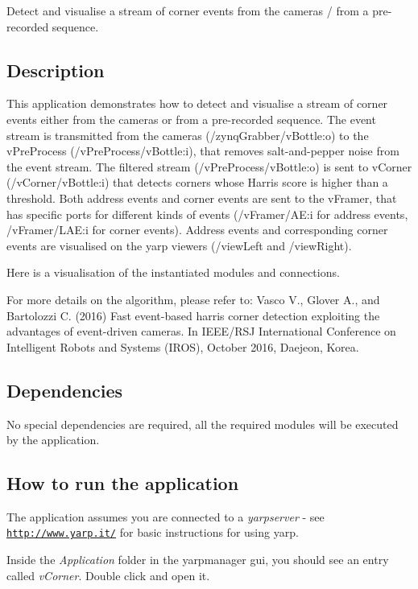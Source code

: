 Detect and visualise a stream of corner events from the cameras / from a pre-\/recorded sequence.

\subsection*{Description}

This application demonstrates how to detect and visualise a stream of corner events either from the cameras or from a pre-\/recorded sequence. The event stream is transmitted from the cameras (/zynq\+Grabber/v\+Bottle\+:o) to the v\+Pre\+Process (/v\+Pre\+Process/v\+Bottle\+:i), that removes salt-\/and-\/pepper noise from the event stream. The filtered stream (/v\+Pre\+Process/v\+Bottle\+:o) is sent to v\+Corner (/v\+Corner/v\+Bottle\+:i) that detects corners whose Harris score is higher than a threshold. Both address events and corner events are sent to the v\+Framer, that has specific ports for different kinds of events (/v\+Framer/\+AE\+:i for address events, /v\+Framer/\+L\+AE\+:i for corner events). Address events and corresponding corner events are visualised on the yarp viewers (/view\+Left and /view\+Right).

Here is a visualisation of the instantiated modules and connections.



For more details on the algorithm, please refer to\+: Vasco V., Glover A., and Bartolozzi C. (2016) Fast event-\/based harris corner detection exploiting the advantages of event-\/driven cameras. In I\+E\+E\+E/\+R\+SJ International Conference on Intelligent Robots and Systems (I\+R\+OS), October 2016, Daejeon, Korea.

\subsection*{Dependencies}

No special dependencies are required, all the required modules will be executed by the application.

\subsection*{How to run the application}

The application assumes you are connected to a {\itshape yarpserver} -\/ see \href{http://www.yarp.it/}{\tt http\+://www.\+yarp.\+it/} for basic instructions for using yarp.

Inside the {\itshape Application} folder in the yarpmanager gui, you should see an entry called {\itshape v\+Corner}. Double click and open it.

